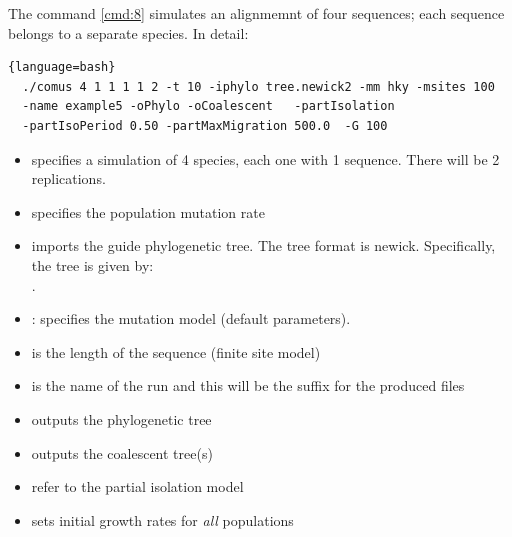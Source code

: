 The command \ref{cmd:8} simulates an alignmemnt of four sequences; each sequence belongs to a separate species. In detail:

\begin{lstlisting}[label=cmd:8, caption={Two species, user-defined phylogenetic tree}]{language=bash}
  ./comus 4 1 1 1 1 2 -t 10 -iphylo tree.newick2 -mm hky -msites 100 
  -name example5 -oPhylo -oCoalescent   -partIsolation 
  -partIsoPeriod 0.50 -partMaxMigration 500.0  -G 100
\end{lstlisting}


\begin{itemize}
\item {} specifies a simulation of 4 species, each one with 1 sequence. There will be 2 replications.
\item {} specifies the population mutation rate
\item {} imports the guide phylogenetic tree. The tree format is newick. Specifically, the tree is given by:\\
. 
\item {}: specifies the mutation model (default parameters).
\item {} is the length of the sequence (finite site model)
\item {} is the name of the run and this will be the suffix for the produced files
\item {} outputs the phylogenetic tree
\item {} outputs the coalescent tree(s)
\item {} refer to the partial isolation model
\item {} sets initial growth rates for \emph{all} populations
\end{itemize}






